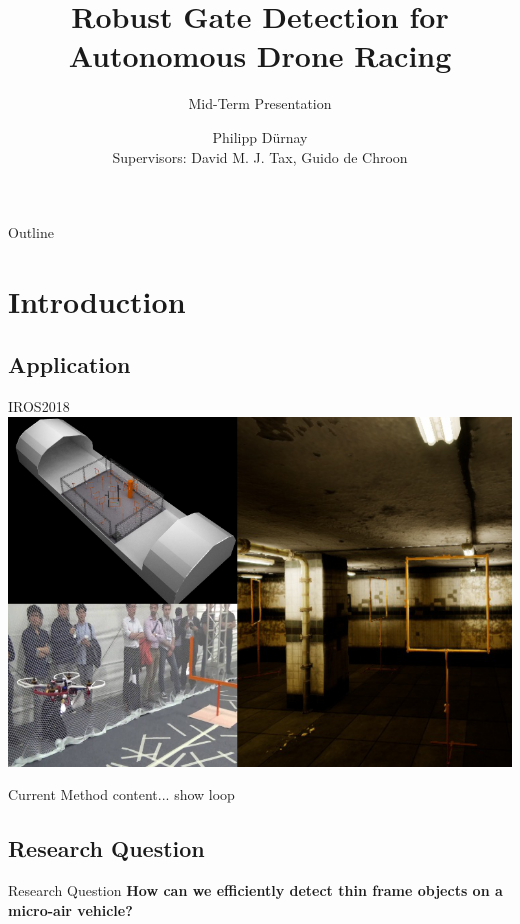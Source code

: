 \documentclass{beamer}
\title{Robust Gate Detection for Autonomous Drone Racing} %
\subtitle{Mid-Term Presentation} %
\author{Philipp Dürnay\\ Supervisors:	 David M. J. Tax, Guido de Chroon}
\begin{document}
  \frame{\maketitle}


  \begin{darkframes}
  	\begin{frame}{Outline}
  		\tableofcontents
  	\end{frame}
	\section{Introduction}
	\subsection{Application}
    \begin{frame}{IROS2018}
    	\includegraphics[width=\textwidth]{fig/application}
    \end{frame}
    \begin{frame}{Current Method}
       	content...
       	show loop
    \end{frame}

	\subsection{Research Question}    
	\begin{frame}{Research Question}
	\textbf{How can we efficiently detect thin frame objects on a micro-air vehicle?}
	\end{frame}

\end{darkframes}
\end{document}
